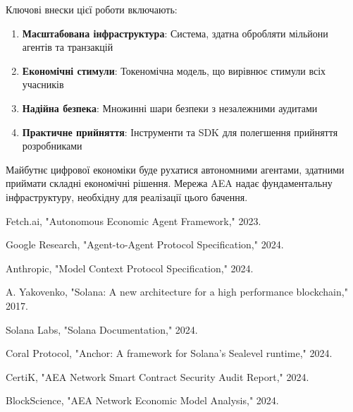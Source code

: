 \documentclass[12pt,a4paper]{article}
\begin{document}
Ключові внески цієї роботи включають:

\begin{enumerate}
\item \textbf{Масштабована інфраструктура}: Система, здатна обробляти мільйони агентів та транзакцій
\item \textbf{Економічні стимули}: Токеномічна модель, що вирівнює стимули всіх учасників
\item \textbf{Надійна безпека}: Множинні шари безпеки з незалежними аудитами
\item \textbf{Практичне прийняття}: Інструменти та SDK для полегшення прийняття розробниками
\end{enumerate}

Майбутнє цифрової економіки буде рухатися автономними агентами, здатними приймати складні економічні рішення. Мережа AEA надає фундаментальну інфраструктуру, необхідну для реалізації цього бачення.

\begin{thebibliography}{99}

Fetch.ai, "Autonomous Economic Agent Framework," 2023.

Google Research, "Agent-to-Agent Protocol Specification," 2024.

Anthropic, "Model Context Protocol Specification," 2024.

A. Yakovenko, "Solana: A new architecture for a high performance blockchain," 2017.

Solana Labs, "Solana Documentation," 2024.

Coral Protocol, "Anchor: A framework for Solana's Sealevel runtime," 2024.

CertiK, "AEA Network Smart Contract Security Audit Report," 2024.

BlockScience, "AEA Network Economic Model Analysis," 2024.

\end{thebibliography}
\end{document}

